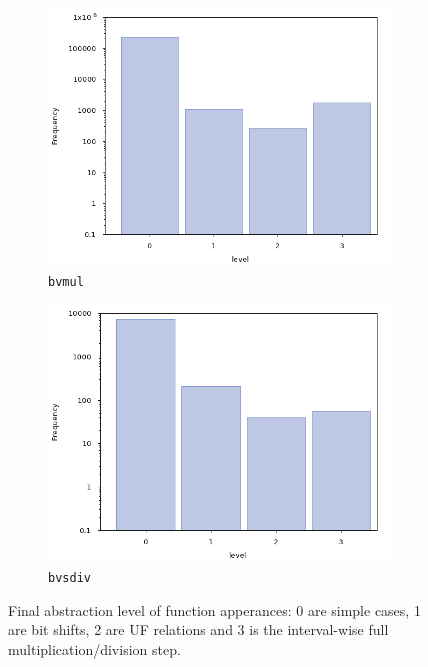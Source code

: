 \begin{figure}[ht]
    \begin{subfigure}[b]{0.5\textwidth}
        \centering
        \includegraphics[width=\textwidth]{plots/unsat/level-MulNode.png}
        \caption{\texttt{bvmul}}
    \end{subfigure}
    \hfill
    \begin{subfigure}[b]{0.5\textwidth}
        \centering
        \includegraphics[width=\textwidth]{plots/unsat/level-SdivNode.png}
        \caption{\texttt{bvsdiv}}
    \end{subfigure}
    \caption{Final abstraction level of function apperances: 0 are simple cases, 1 are bit shifts, 2 are UF relations and 3 is the interval-wise full multiplication/division step.}
    \label{fig:evaluation:unsat:level}
\end{figure}

